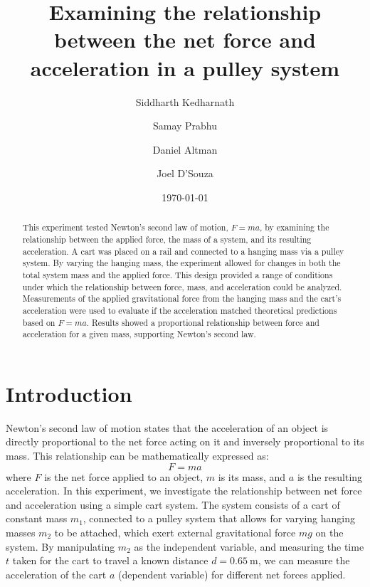 ﻿\documentclass[reprint,amsmath,amssymb,aps]{revtex4-2}
\begin{document}
\title{Examining the relationship between the net force and acceleration in a pulley system}
\author{Siddharth Kedharnath}
\author{Samay Prabhu}
\author{Daniel Altman}
\author{Joel D'Souza}
\date{\today}

\begin{abstract}
This experiment tested Newton’s second law of motion, $F=ma$, by examining the relationship between the applied force, the mass of a system, and its resulting acceleration. A cart was placed on a rail and connected to a hanging mass via a pulley system. By varying the hanging mass, the experiment allowed for changes in both the total system mass and the applied force. This design provided a range of conditions under which the relationship between force, mass, and acceleration could be analyzed. Measurements of the applied gravitational force from the hanging mass and the cart's acceleration were used to evaluate if the acceleration matched theoretical predictions based on $F=ma$. Results showed a proportional relationship between force and acceleration for a given mass, supporting Newton’s second law.
\end{abstract}


\maketitle







\section{Introduction}
Newton's second law of motion\cite{tipler} states that the acceleration of an object is directly proportional to the net force acting on it and inversely proportional to its mass. This relationship can be mathematically expressed as:
\begin{equation}
F = ma
\end{equation}
where $F$ is the net force applied to an object, $m$ is its mass, and $a$ is the resulting acceleration.  In this experiment, we investigate the relationship between net force and acceleration using a simple cart system. The system consists of a cart of constant mass $m_1$, connected to a pulley system that allows for varying hanging masses $m_2$ to be attached, which exert external gravitational force $mg$ on the system. By manipulating $m_2$ as the independent variable, and measuring the time $t$ taken for the cart to travel a known distance $d=\qty{0.65}{\meter}$, we can measure the acceleration of the cart $a$ (dependent variable) for different net forces applied. 
\end{document}
